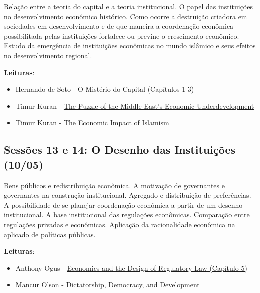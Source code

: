 \documentclass[12pt,]{article}
\providecommand{\tightlist}{%
  \setlength{\itemsep}{0pt}\setlength{\parskip}{0pt}}
\begin{document}
Relação entre a teoria do capital e a teoria institucional. O papel das
instituições no desenvolvimento econômico histórico. Como ocorre a
destruição criadora em sociedades em desenvolvimento e de que maneira a
coordenação econômica possibilitada pelas instituições fortalece ou
previne o crescimento econômico. Estudo da emergência de instituições
econômicas no mundo islâmico e seus efeitos no desenvolvimento regional.

\textbf{Leituras}:

\begin{itemize}
\tightlist
\item
  Hernando de Soto - O Mistério do Capital (Capítulos 1-3)
\item
  Timur Kuran -
  \href{https://github.com/danilofreire/economia-politica-instituicoes-ufm/blob/master/sessoes-11-12/kuran-01.pdf}{The
  Puzzle of the Middle East's Economic Underdevelopment}
\item
  Timur Kuran -
  \href{https://github.com/danilofreire/economia-politica-instituicoes-ufm/blob/master/sessoes-11-12/kuran-02.pdf}{The
  Economic Impact of Islamism}
\end{itemize}

\subsection{Sessões 13 e 14: O Desenho das Instituições
(10/05)}\label{sessoes-13-e-14-o-desenho-das-instituicoes-1005}

Bens públicos e redistribuição econômica. A motivação de governantes e
governantes na construção institucional. Agregado e distribuição de
preferências. A possibilidade de se planejar coordenação econômica a
partir de um desenho institucional. A base institucional das regulações
econômicas. Comparação entre regulações privadas e econômicas. Aplicação
da racionalidade econômica na aplicado de políticas públicas.

\textbf{Leituras}:

\begin{itemize}
\tightlist
\item
  Anthony Ogus -
  \href{https://github.com/danilofreire/economia-politica-instituicoes-ufm/blob/master/sessoes-13-14/ogus.pdf}{Economics
  and the Design of Regulatory Law (Capítulo 5)}
\item
  Mancur Olson -
  \href{https://github.com/danilofreire/economia-politica-instituicoes-ufm/blob/master/sessoes-13-14/olson.pdf}{Dictatorship,
  Democracy, and Development}
\end{itemize}
\end{document}

